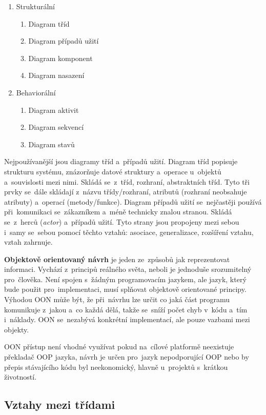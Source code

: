 \begin{enumerate}
	\item Strukturální
	\begin{enumerate}
		 \item Diagram tříd
		 \item Diagram případů užití
		 \item Diagram komponent
		 \item Diagram nasazení
	\end{enumerate}
	\item Behaviorální
	\begin{enumerate}
		 \item Diagram aktivit
		 \item Diagram sekvencí
		 \item Diagram stavů
	\end{enumerate}
\end{enumerate}

Nejpoužívanější jsou diagramy tříd a~případů užití. Diagram tříd popisuje strukturu systému, znázorňuje datové struktury a~operace u~objektů a~souvislosti mezi nimi. Skládá se~z~tříd, rozhraní, abstraktních tříd. Tyto tři prvky se~dále skládají z~názvu třídy/rozhraní, atributů (rozhraní neobsahuje atributy) a~operací (metody/funkce). Diagram případů užití se~nejčastěji používá při~komunikaci se~zákazníkem a~méně technicky znalou stranou. Skládá se~z~herců (\emph{actor}) a~případů užití. Tyto strany jsou propojeny mezi sebou i~samy se~sebou pomocí těchto vztahů: asociace, generalizace, rozšíření vztahu, vztah zahrnuje.

\textbf{Objektově orientovaný návrh} je jeden ze~způsobů jak reprezentovat informaci. Vychází z~principů reálného světa, neboli je jednoduše srozumitelný pro~člověka. Není spojen s~žádným programovacím jazykem, ale jazyk, který bude použit pro~implementaci, musí splňovat objektově orientované principy. Výhodou OON může být, že při~návrhu lze určit co jaká část programu komunikuje z~jakou a~co každá dělá, takže se~sníží počet chyb v~kódu a~tím i~náklady. OON se~nezabývá konkrétní implementací, ale pouze vazbami mezi objekty.

OON přístup není vhodné využívat pokud na~cílové platformě neexistuje překladač OOP jazyka, návrh je určen pro~jazyk nepodporující OOP nebo by přepis stávajícího kódu byl neekonomický, hlavně u~projektů s~krátkou životností.

\subsection{Vztahy mezi třídami}

